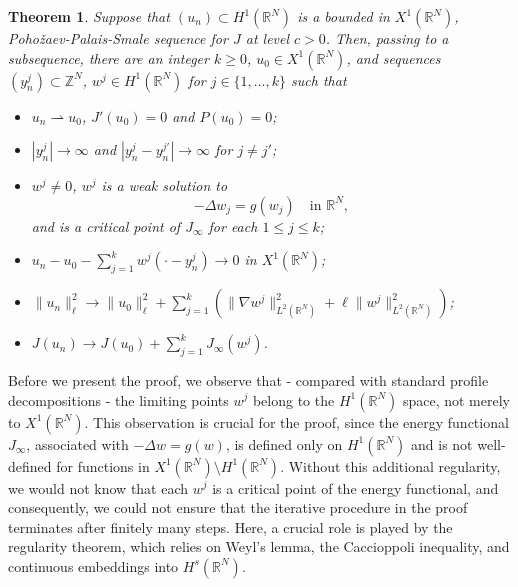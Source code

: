 \documentclass[12pt,leqno,twoside,sort]{amsart}
\newtheorem{Th}{Theorem}[section]
\newcommand{\R}{\mathbb{R}}
\newcommand{\Z}{\mathbb{Z}}
\newcommand{\weakto}{\rightharpoonup}
\numberwithin{equation}{section}
\begin{document}
\begin{Th}\label{Th:splitting}
Suppose that $(u_n) \subset H^1 (\R^N)$ is a bounded in $X^1(\R^N)$, Poho\v{z}aev-Palais-Smale sequence for $J$ at level $c > 0$. Then, passing to a subsequence, there are an integer $k \geq 0$, $u_0 \in X^1 (\R^N)$, and sequences $(y_n^j) \subset \Z^N$, $w^j \in H^1 (\R^N)$ for $j\in \{1,\ldots, k\}$ such that

\begin{itemize}
\item[(a)] $u_n \weakto u_0$, $J'(u_0)=0$ and $P(u_0)=0$;
\item[(b)] $|y_n^j| \to \infty$ and $|y_n^j - y_n^{j'}|\to \infty$ for $j \neq j'$;
\item[(c)] $w^j \neq 0$, $w^j$ is a weak solution to
$$
-\Delta w_j = g(w_j) \quad \mbox{in } \R^N,
$$
and is a critical point of $J_{\infty}$ for each $1 \leq j \leq k$;
\item[(d)] $u_n - u_0 - \sum_{j=1}^k w^j (\cdot - y_n^j) \to 0$ in $X^1 (\R^N)$;
\item[(e)] $\|u_n\|^2_\ell\to \|u_0\|^2_\ell+\sum_{j=1}^k  \left( \|\nabla w^j\|_{L^2 (\R^N)}^2 + \ell \| w^j \|_{L^2 (\R^N)}^2 \right)$;
\item[(f)] $J(u_n) \to J(u_0) + \sum_{j=1}^k J_\infty (w^j)$.
\end{itemize}
\end{Th}




Before we present the proof, we observe that - compared with standard profile decompositions - the limiting points $w^j$ belong to the $H^1(\R^N)$ space, not merely to $X^1 (\R^N)$. This observation is crucial for the proof, since the energy functional $J_\infty$, associated with $-\Delta w = g(w)$, is defined only on $H^1 (\R^N)$ and is not well-defined for functions in $X^1 (\R^N) \setminus H^1 (\R^N)$. Without this additional regularity, we would not know that each $w^j$ is a critical point of the energy functional, and consequently, we could not ensure that the iterative procedure in the proof terminates after finitely many steps. Here, a crucial role is played by the regularity theorem, which relies on Weyl’s lemma, the Caccioppoli inequality, and continuous embeddings into $H^s (\R^N)$.
\end{document}
